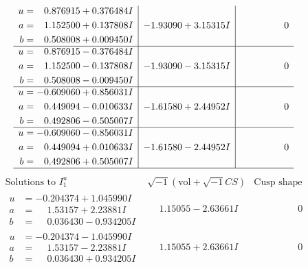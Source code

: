 \documentclass[1p]{elsarticle_modified}
\theoremstyle{definition}
\newcommand{\I}{\sqrt{-1}}
\begin{document}
$$\begin{array}{c|c|c}
\begin{aligned}
u &= \phantom{-}0.876915 + 0.376484 I \\
a &= \phantom{-}1.152500 + 0.137808 I \\
b &= \phantom{-}0.508008 + 0.009450 I\end{aligned}
 & -1.93090 + 3.15315 I & \phantom{-0.000000 } 0 \\ \hline\begin{aligned}
u &= \phantom{-}0.876915 - 0.376484 I \\
a &= \phantom{-}1.152500 - 0.137808 I \\
b &= \phantom{-}0.508008 - 0.009450 I\end{aligned}
 & -1.93090 - 3.15315 I & \phantom{-0.000000 } 0 \\ \hline\begin{aligned}
u &= -0.609060 + 0.856031 I \\
a &= \phantom{-}0.449094 - 0.010633 I \\
b &= \phantom{-}0.492806 - 0.505007 I\end{aligned}
 & -1.61580 + 2.44952 I & \phantom{-0.000000 } 0 \\ \hline\begin{aligned}
u &= -0.609060 - 0.856031 I \\
a &= \phantom{-}0.449094 + 0.010633 I \\
b &= \phantom{-}0.492806 + 0.505007 I\end{aligned}
 & -1.61580 - 2.44952 I & \phantom{-0.000000 } 0\\
 \hline 
 \end{array}$$\newpage$$\begin{array}{c|c|c}  
\text{Solutions to }I^u_{1}& \I (\text{vol} + \sqrt{-1}CS) & \text{Cusp shape}\\
 \hline 
\begin{aligned}
u &= -0.204374 + 1.045990 I \\
a &= \phantom{-}1.53157 + 2.23881 I \\
b &= \phantom{-}0.036430 - 0.934205 I\end{aligned}
 & \phantom{-}1.15055 - 2.63661 I & \phantom{-0.000000 } 0 \\ \hline\begin{aligned}
u &= -0.204374 - 1.045990 I \\
a &= \phantom{-}1.53157 - 2.23881 I \\
b &= \phantom{-}0.036430 + 0.934205 I\end{aligned}
 & \phantom{-}1.15055 + 2.63661 I & \phantom{-0.000000 } 0 \\ \hline\begin{aligned}

\end{aligned}
\end{array}$$
\end{document}
